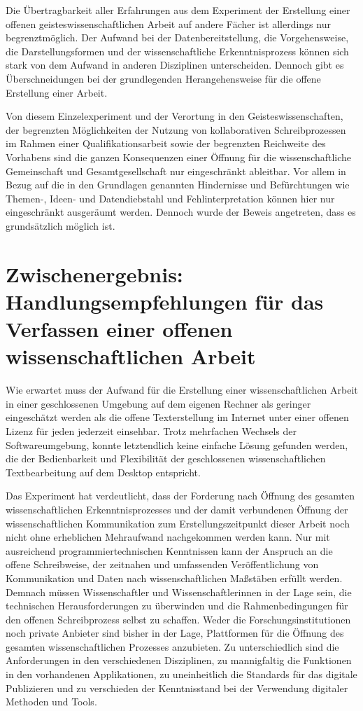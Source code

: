 Die Übertragbarkeit aller Erfahrungen aus dem Experiment der Erstellung einer offenen geisteswissenschaftlichen Arbeit auf andere Fächer ist allerdings nur begrenztmöglich. Der Aufwand bei der Datenbereitstellung, die Vorgehensweise, die Darstellungsformen und der wissenschaftliche Erkenntnisprozess können sich stark von dem Aufwand in anderen Disziplinen unterscheiden. Dennoch gibt es Überschneidungen bei der grundlegenden Herangehensweise für die offene Erstellung einer Arbeit.

Von diesem Einzelexperiment und der Verortung in den Geisteswissenschaften, der begrenzten Möglichkeiten der Nutzung von kollaborativen Schreibprozessen im Rahmen einer Qualifikationsarbeit sowie der begrenzten Reichweite des Vorhabens sind die ganzen Konsequenzen einer Öffnung für die wissenschaftliche Gemeinschaft und Gesamtgesellschaft nur eingeschränkt ableitbar. Vor allem in Bezug auf die in den Grundlagen genannten Hindernisse und Befürchtungen wie Themen-, Ideen- und Datendiebstahl und Fehlinterpretation können hier nur eingeschränkt ausgeräumt werden. Dennoch wurde der Beweis angetreten, dass es grundsätzlich möglich ist.

\section{Zwischenergebnis: Handlungsempfehlungen für das Verfassen einer offenen wissenschaftlichen Arbeit}

Wie erwartet muss der Aufwand für die Erstellung einer wissenschaftlichen Arbeit in einer geschlossenen Umgebung auf dem eigenen Rechner als geringer eingeschätzt werden als die offene Texterstellung im Internet unter einer offenen Lizenz für jeden jederzeit einsehbar. Trotz mehrfachen Wechsels der Softwareumgebung, konnte letztendlich keine einfache Lösung gefunden werden, die der Bedienbarkeit und Flexibilität der geschlossenen wissenschaftlichen Textbearbeitung auf dem Desktop entspricht.

Das Experiment hat verdeutlicht, dass der Forderung nach Öffnung des gesamten wissenschaftlichen Erkenntnisprozesses und der damit verbundenen Öffnung der wissenschaftlichen Kommunikation zum Erstellungszeitpunkt dieser Arbeit noch nicht ohne erheblichen Mehraufwand nachgekommen werden kann. Nur mit ausreichend programmiertechnischen Kenntnissen kann der Anspruch an die offene Schreibweise, der zeitnahen und umfassenden Veröffentlichung von Kommunikation und Daten nach wissenschaftlichen Maßstäben erfüllt werden. Demnach müssen Wissenschaftler und Wissenschaftlerinnen in der Lage sein, die technischen Herausforderungen zu überwinden und die Rahmenbedingungen für den offenen Schreibprozess selbst zu schaffen. Weder die Forschungsinstitutionen noch private Anbieter sind bisher in der Lage, Plattformen für die Öffnung des gesamten wissenschaftlichen Prozesses anzubieten. Zu unterschiedlich sind die Anforderungen in den verschiedenen Disziplinen, zu mannigfaltig die Funktionen in den vorhandenen Applikationen, zu uneinheitlich die Standards für das digitale Publizieren und zu verschieden der Kenntnisstand bei der Verwendung digitaler Methoden und Tools.

